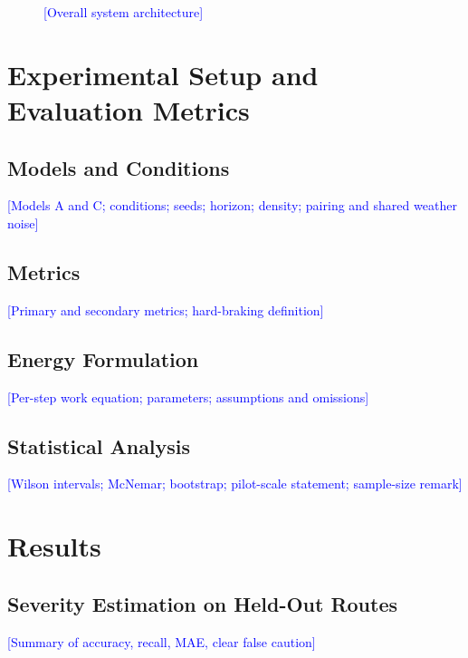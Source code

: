 \documentclass[conference]{IEEEtran}
\newcommand{\placeholder}[1]{\textcolor{blue}{[#1]}}
\newcommand{\figslot}[2]{\fbox{\parbox[c][#2][c]{0.94\columnwidth}{\centering\textcolor{blue}{FIGURE SLOT\\[1mm]#1}}}}
\begin{document}
\begin{figure}[t]
\centering
\figslot{figures/fig\_architecture.png\\Vertical overall system diagram (tall)\\(source: Architecture\_Severity\_System\_v3\_vertical.drawio, page 1; pages 2--5 = appendix figures fig\_arch\_*.png)}{110mm}
\caption{\placeholder{Overall system architecture}}
\label{fig:arch}
\end{figure}

\section{Experimental Setup and Evaluation Metrics}\label{sec:setup}
\subsection{Models and Conditions}
\placeholder{Models A and C; conditions; seeds; horizon; density; pairing and shared weather noise}
\subsection{Metrics}
\placeholder{Primary and secondary metrics; hard-braking definition}
\subsection{Energy Formulation}\label{sec:energy}
\placeholder{Per-step work equation; parameters; assumptions and omissions}
\subsection{Statistical Analysis}
\placeholder{Wilson intervals; McNemar; bootstrap; pilot-scale statement; sample-size remark}

\section{Results}\label{sec:results}
\subsection{Severity Estimation on Held-Out Routes}
\placeholder{Summary of accuracy, recall, MAE, clear false caution}

\begin{table}[t]
\centering
\caption{\placeholder{Held-out estimator results per condition}}
\label{tab:est}
\end{table}
\end{document}
